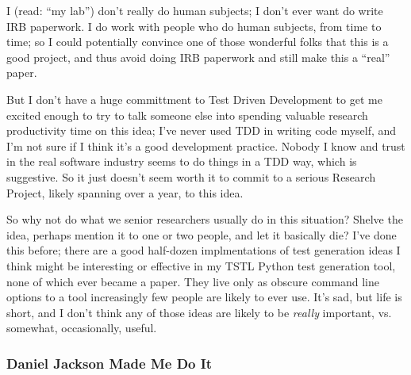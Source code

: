 \documentclass[sigplan,screen]{acmart}
\begin{document}
I (read: ``my lab'') don't really do human subjects; I don't ever want do
write IRB paperwork.  I do work with people who do human subjects,
from time to time; so I could potentially convince one of those
wonderful folks that this is a good project, and thus avoid doing IRB
paperwork and still make this a ``real'' paper.

But I don't have a huge committment to Test
Driven Development to get me excited enough to try to talk someone
else into spending valuable research productivity time on this idea; I've never used
TDD in writing code myself, and I'm not sure if I think it's a good development
practice.  Nobody I know and trust in the real software industry seems
to do things in a TDD way, which is suggestive.  So it just doesn't
seem worth it to commit to a serious Research Project, likely spanning
over a year, to this idea.

So why not do what we senior researchers usually do in this situation?
Shelve the idea, perhaps mention it to one or two people, and let it
basically die?  I've done this before; there are a good half-dozen
implmentations of test generation ideas I think might be interesting
or effective in my TSTL Python test generation tool, none of which
ever became a paper.  They live only as obscure command line options
to a tool increasingly few people are likely to ever use.  It's sad,
but life is short, and I don't think any of those ideas are likely to
be \emph{really} important, vs. somewhat, occasionally, useful.

\subsubsection{Daniel Jackson Made Me Do It}
\end{document}

